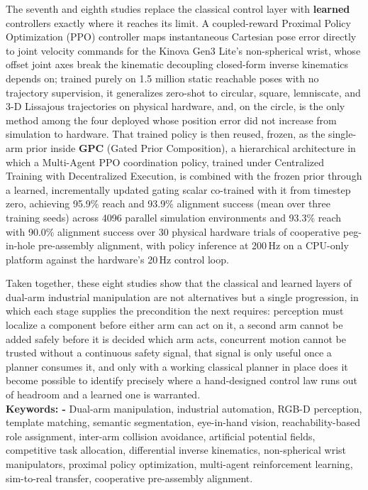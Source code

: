\begin{Abstract}
The seventh and eighth studies replace the classical control layer with \textbf{learned}
controllers exactly where it reaches its limit. A coupled-reward Proximal Policy Optimization (PPO)
controller maps instantaneous Cartesian pose error directly to joint velocity commands for the
Kinova Gen3 Lite's non-spherical wrist, whose offset joint axes break the kinematic decoupling
closed-form inverse kinematics depends on; trained purely on 1.5 million static reachable poses with
no trajectory supervision, it generalizes zero-shot to circular, square, lemniscate, and 3-D
Lissajous trajectories on physical hardware, and, on the circle, is the only method among the
four deployed whose position error did not increase from simulation to hardware. That trained policy is then
reused, frozen, as the single-arm prior inside \textbf{GPC} (Gated Prior Composition), a hierarchical
architecture in which a Multi-Agent PPO coordination policy, trained under Centralized Training
with Decentralized Execution, is combined with the frozen prior through a learned, incrementally
updated gating scalar co-trained with it from timestep zero, achieving 95.9\% reach and 93.9\%
alignment success (mean over three training seeds) across 4096 parallel simulation environments and 93.3\% reach with 90.0\%
alignment success over 30 physical hardware trials of cooperative peg-in-hole pre-assembly
alignment, with policy inference at 200\,Hz on a CPU-only platform against the hardware's 20\,Hz
control loop.

Taken together, these eight studies show that the classical and learned layers of dual-arm
industrial manipulation are not alternatives but a single progression, in which each stage supplies
the precondition the next requires: perception must localize a component before either arm can act
on it, a second arm cannot be added safely before it is decided which arm acts, concurrent motion
cannot be trusted without a continuous safety signal, that signal is only useful once a planner
consumes it, and only with a working classical planner in place does it become possible to identify
precisely where a hand-designed control law runs out of headroom and a learned one is warranted.
\\
\textbf{Keywords: -} Dual-arm manipulation, industrial automation, RGB-D perception, template
matching, semantic segmentation, eye-in-hand vision, reachability-based role assignment,
inter-arm collision avoidance, artificial potential fields, competitive task
allocation, differential inverse kinematics, non-spherical wrist manipulators, proximal policy
optimization, multi-agent reinforcement learning, sim-to-real transfer, cooperative pre-assembly
alignment.
\end{Abstract}